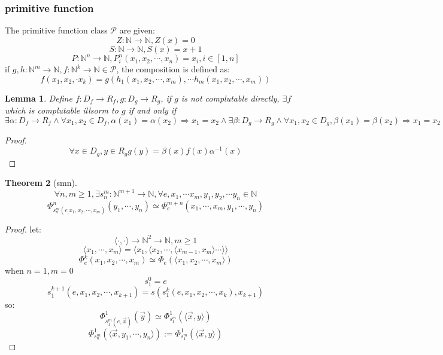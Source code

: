\documentclass[10pt,a4paper]{article}
\newtheorem{theorem}{Theorem}[section]
\newtheorem{lemma}[theorem]{Lemma}
\begin{document}
\subsubsection{primitive function}
The primitive function class $\mathcal{P}$ are given:
\[Z:\mathbb{N}\to\mathbb{N},Z(x)=0\]
\[S:\mathbb{N}\to\mathbb{N},S(x)=x+1\]
\[P:\mathbb{N}^n\to\mathbb{N},P_{i}^{n}(x_1,x_2,\cdots,x_n)=x_i,i\in[1,n]\]
if $g,h:\mathbb{N}^m\to\mathbb{N},f:\mathbb{N}^k\to\mathbb{N}\in\mathcal{P}$, the composition is defined as:
\[f(x_1,x_2,\cdot x_k)=g(h_1(x_1,x_2,\cdots,x_m),\cdots h_m(x_1,x_2,\cdots,x_m))\]
\begin{lemma}
    Define $f:D_f\to R_f,g:D_g\to R_g$, if $g$ is 
    not complutable directly, $\exists f$ which is complutable illsorm to $g$ if and only if
    \[\exists\alpha:D_f\to R_f\land\forall x_1,x_2\in D_f,\alpha(x_1)=\alpha(x_2)\Rightarrow x_1=x_2\land\exists\beta:D_g\to R_g\land\forall x_1,x_2\in D_g,\beta(x_1)=\beta(x_2)\Rightarrow x_1=x_2\]
\end{lemma}
\begin{proof}
    \[\forall x\in D_g,y\in R_g g(y)=\beta(x)f(x)\alpha^{-1}(x)\]
\end{proof}
\begin{theorem}[smn]
    \[\forall n,m\ge 1,\exists s_n^m:\mathbb{N}^{m+1}\to\mathbb{N},\forall e,x_1,\cdots x_m,y_1,y_2,\cdots y_n\in\mathbb{N}\]
    \[\Phi_{{s_n^m}(e_,x_1,x_2,\cdots,x_m)}^n(y_1,\cdots,y_n)\simeq\Phi_{e}^{m+n}(x_1,\cdots,x_m,y_1,\cdots,y_n)\]
\end{theorem}
\begin{proof}
    let:
    \[\langle\cdot,\cdot\rangle\to\mathbb{N}^2\to\mathbb{N},m\ge 1\]
    \[\langle x_1,\cdots,x_m\rangle=\langle x_1,\langle x_2,\cdots,\langle x_{m-1},x_m\rangle\cdots\rangle\rangle\]
    \[\Phi_e^k(x_1,x_2,\cdots,x_m)\simeq\Phi_e(\langle x_1,x_2,\cdots,x_m\rangle)\]
    when $n=1,m=0$
    \[s_1^0=e\]
    \[s_1^{k+1}(e,x_1,x_2,\cdots,x_{k+1})=s(s_1^k(e,x_1,x_2,\cdots,x_k),x_{k+1})\]
    so:\[\Phi_{s_1^m(e,\vec{x})}^1(\vec{y})\simeq\Phi_{s_1^m}^1(\langle\vec{x},y\rangle)\]
    \[\Phi_{s_n^m}^1(\langle\vec{x},y_1,\cdots,y_n\rangle):=\Phi_{s_1^m}^1(\langle\vec{x},y\rangle)\]
\end{proof}
\end{document}
